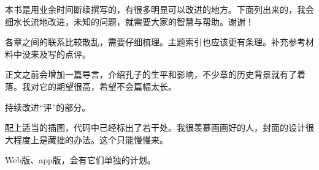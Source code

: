 本书是用业余时间断续撰写的，有很多明显可以改进的地方。下面列出来的，我会细水长流地改进，未知的问题，就需要大家的智慧与帮助。谢谢！
\begin{lyitemize}
\item 各章之间的联系比较散乱，需要仔细梳理。主题索引也应该更有条理。补充参考材料中没来及写的点评。
\item 正文之前会增加一篇导言，介绍孔子的生平和影响，不少章的历史背景就有了着落。我对它的期望很高，希望不会篇幅太长。
\item 持续改进“评”的部分。
\item 配上适当的插图，代码中已经标出了若干处。我很羡慕画画好的人，封面的设计很大程度上是藏拙的办法。这个只能慢慢来。
\item Web版、app版，会有它们单独的计划。
\end{lyitemize}

